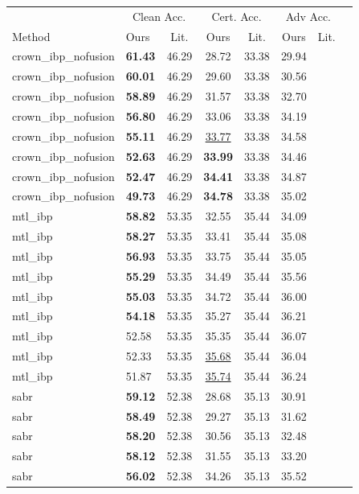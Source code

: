 \begin{tabular}{llcccccc}
\toprule
 & \multicolumn{2}{c}{Clean Acc.} & \multicolumn{2}{c}{Cert. Acc.} & \multicolumn{2}{c}{Adv Acc.} \\
Method & Ours & Lit. & Ours & Lit. & Ours & Lit. \\
\midrule
crown\_ibp\_nofusion & \textbf{61.43} & 46.29 & 28.72 & 33.38 & 29.94 & \\
crown\_ibp\_nofusion & \textbf{60.01} & 46.29 & 29.60 & 33.38 & 30.56 & \\
crown\_ibp\_nofusion & \textbf{58.89} & 46.29 & 31.57 & 33.38 & 32.70 & \\
crown\_ibp\_nofusion & \textbf{56.80} & 46.29 & 33.06 & 33.38 & 34.19 & \\
crown\_ibp\_nofusion & \textbf{55.11} & 46.29 & \underline{33.77} & 33.38 & 34.58 & \\
crown\_ibp\_nofusion & \textbf{52.63} & 46.29 & \textbf{33.99} & 33.38 & 34.46 & \\
crown\_ibp\_nofusion & \textbf{52.47} & 46.29 & \textbf{34.41} & 33.38 & 34.87 & \\
crown\_ibp\_nofusion & \textbf{49.73} & 46.29 & \textbf{34.78} & 33.38 & 35.02 & \\
mtl\_ibp & \textbf{58.82} & 53.35 & 32.55 & 35.44 & 34.09 & \\
mtl\_ibp & \textbf{58.27} & 53.35 & 33.41 & 35.44 & 35.08 & \\
mtl\_ibp & \textbf{56.93} & 53.35 & 33.75 & 35.44 & 35.05 & \\
mtl\_ibp & \textbf{55.29} & 53.35 & 34.49 & 35.44 & 35.56 & \\
mtl\_ibp & \textbf{55.03} & 53.35 & 34.72 & 35.44 & 36.00 & \\
mtl\_ibp & \textbf{54.18} & 53.35 & 35.27 & 35.44 & 36.21 & \\
mtl\_ibp & 52.58 & 53.35 & 35.35 & 35.44 & 36.07 & \\
mtl\_ibp & 52.33 & 53.35 & \underline{35.68} & 35.44 & 36.04 & \\
mtl\_ibp & 51.87 & 53.35 & \underline{35.74} & 35.44 & 36.24 & \\
sabr & \textbf{59.12} & 52.38 & 28.68 & 35.13 & 30.91 & \\
sabr & \textbf{58.49} & 52.38 & 29.27 & 35.13 & 31.62 & \\
sabr & \textbf{58.20} & 52.38 & 30.56 & 35.13 & 32.48 & \\
sabr & \textbf{58.12} & 52.38 & 31.55 & 35.13 & 33.20 & \\
sabr & \textbf{56.02} & 52.38 & 34.26 & 35.13 & 35.52 & \\

\end{tabular}
